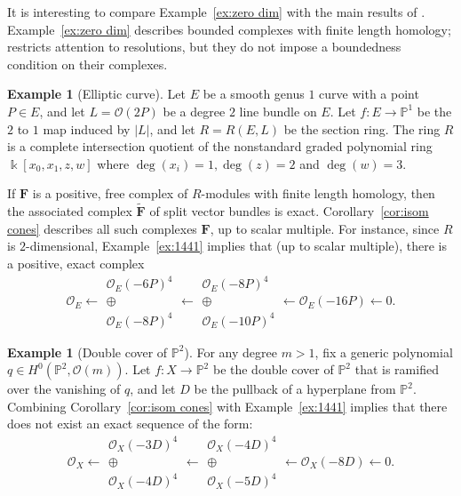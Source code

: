 \documentclass[12pt]{amsart}
\theoremstyle{definition}
\newtheorem{example}[lemma]{Example}
\theoremstyle{remark}
\newcommand{\kk}{\Bbbk}
\newcommand{\PP}{\mathbb{P}}
\newcommand{\cO}{\mathcal{O}}
\newcommand{\FF}{\mathbf{F}}
\begin{document}
It is interesting to compare Example~\ref{ex:zero dim} with the main results of \cite{bbeg}.  Example~\ref{ex:zero dim} describes bounded complexes with finite length homology; \cite{bbeg} restricts attention to resolutions, but they do not impose a boundedness condition on their complexes.

\begin{example}[Elliptic curve]
Let $E$ be a smooth genus $1$ curve with a point $P\in E$, and let $L=\cO(2P)$ be a degree $2$ line bundle on $E$.  Let $f\colon E\to \PP^1$ be the $2$ to $1$ map induced by $|L|$, and let $R=R(E,L)$ be the section ring.  The ring $R$ is a complete intersection quotient of the nonstandard graded polynomial ring $\kk[x_0,x_1,z,w]$ where $\deg(x_i)=1, \deg(z)=2$ and $\deg(w)=3$.  

If $\FF$ is a positive, free complex of $R$-modules with finite length homology, then the associated complex $\widetilde{\FF}$ of split vector bundles is exact.  Corollary~\ref{cor:isom cones} describes all such complexes $\FF$, up to scalar multiple.
For instance, since $R$ is $2$-dimensional, Example~\ref{ex:1441} implies that (up to scalar multiple), there is a positive, exact complex
\[
\cO_E\longleftarrow \begin{matrix}  \cO_E(-6P)^4\\ \oplus\\ \cO_E(-8P)^4\end{matrix}\longleftarrow \begin{matrix}  \cO_E(-8P)^4\\ \oplus\\ \cO_E(-10P)^4\end{matrix} \longleftarrow \cO_E(-16P)\longleftarrow 0.
\]
\end{example}



\begin{example}[Double cover of $\PP^2$]
For any degree $m>1$, fix a generic polynomial $q\in H^0(\PP^2, \cO(m))$.  Let $f\colon X\to\PP^2$ be the double cover of $\PP^2$ that is ramified over the vanishing of $q$, and let $D$ be the pullback of a hyperplane from $\PP^2$.  Combining Corollary~\ref{cor:isom cones} with Example~\ref{ex:1441} implies that there does not exist an exact sequence of the form:
\[
\cO_X\longleftarrow \begin{matrix}  \cO_X(-3D)^4\\ \oplus\\ \cO_X(-4D)^4\end{matrix}\longleftarrow \begin{matrix}  \cO_X(-4D)^4\\ \oplus\\ \cO_X(-5D)^4\end{matrix} \longleftarrow \cO_X(-8D)\longleftarrow 0.
\]
\end{example}
\end{document}
